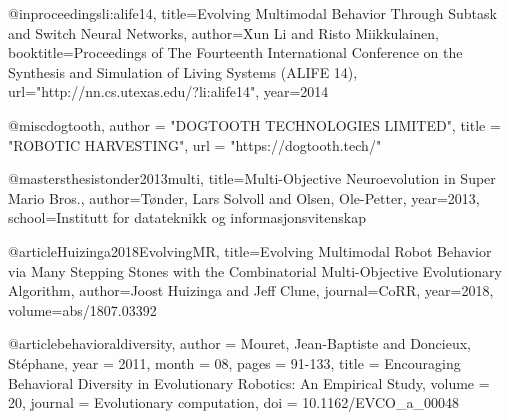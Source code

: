 @inproceedings{li:alife14,
  title={Evolving Multimodal Behavior Through Subtask and Switch Neural Networks},
  author={Xun Li and Risto Miikkulainen},
  booktitle={Proceedings of The Fourteenth International Conference on the Synthesis and Simulation of Living Systems (ALIFE 14)},
  url="http://nn.cs.utexas.edu/?li:alife14",
  year={2014}
}

@misc{dogtooth,
    author    = "DOGTOOTH TECHNOLOGIES LIMITED",
    title     = "ROBOTIC HARVESTING",
    url       = "https://dogtooth.tech/"
}

@mastersthesis{tonder2013multi,
  title={Multi-Objective Neuroevolution in Super Mario Bros.},
  author={T{\o}nder, Lars Solvoll and Olsen, Ole-Petter},
  year={2013},
  school={Institutt for datateknikk og informasjonsvitenskap}
}

@article{Huizinga2018EvolvingMR,
  title={Evolving Multimodal Robot Behavior via Many Stepping Stones with the Combinatorial Multi-Objective Evolutionary Algorithm},
  author={Joost Huizinga and Jeff Clune},
  journal={CoRR},
  year={2018},
  volume={abs/1807.03392}
}

@article{behavioraldiversity,
  author = {Mouret, Jean-Baptiste and Doncieux, Stéphane},
  year = {2011},
  month = {08},
  pages = {91-133},
  title = {Encouraging Behavioral Diversity in Evolutionary Robotics: An Empirical Study},
  volume = {20},
  journal = {Evolutionary computation},
  doi = {10.1162/EVCO_a_00048}
}

